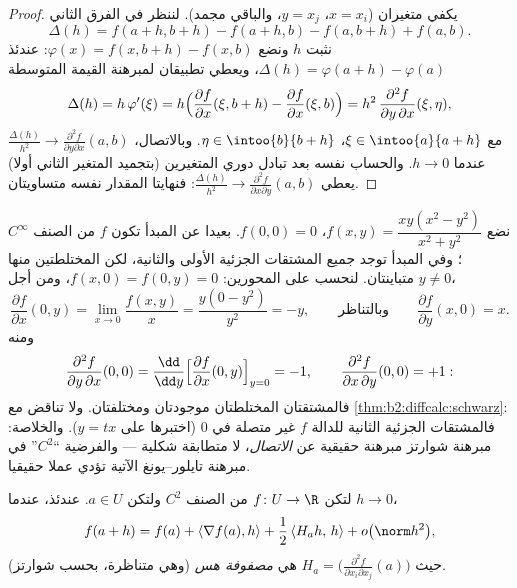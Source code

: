 \begin{proof}
يكفي متغيران ($x = x_i$، $y = x_j$، والباقي مجمد).
لننظر في الفرق الثاني
\[
\Delta(h) = f(a + h, b + h) - f(a + h, b) - f(a, b + h) + f(a,b) .
\]
نثبت $h$ ونضع $\varphi(x) = f(x, b+h) - f(x, b)$: عندئذ $\Delta(h)
= \varphi(a + h) - \varphi(a)$، ويعطي تطبيقان لمبرهنة القيمة
المتوسطة
\[
\Delta(h) = h\,\varphi'(\xi)
= h\Bigl(\frac{\partial f}{\partial x}(\xi, b+h) -
\frac{\partial f}{\partial x}(\xi, b)\Bigr)
= h^2\,\frac{\partial^2 f}{\partial y\,\partial x}(\xi, \eta),
\]
مع $\xi \in \intoo{a}{a+h}$، $\eta \in \intoo{b}{b+h}$. وبالاتصال،
$\frac{\Delta(h)}{h^2} \to \frac{\partial^2 f}{\partial
y\partial x}(a, b)$ عندما $h \to 0$. والحساب نفسه بعد تبادل دوري المتغيرين
(بتجميد المتغير الثاني أولا)
يعطي $\frac{\Delta(h)}{h^2} \to \frac{\partial^2 f}{\partial x
\partial y}(a,b)$: فنهايتا المقدار نفسه متساويتان.
\end{proof}

\begin{example}\label{ex:b2:diffcalc:peano}
نضع $f(x, y) = \dfrac{xy(x^2 - y^2)}{x^2 + y^2}$، $f(0,0) = 0$.
بعيدا عن المبدأ تكون $f$ من الصنف $C^\infty$؛ وفي المبدأ توجد جميع
المشتقات الجزئية الأولى والثانية، لكن المختلطتين منها متباينتان.
لنحسب على المحورين: $f(x, 0) = f(0, y) = 0$، ومن أجل $y \neq 0$،
\[
\frac{\partial f}{\partial x}(0, y)
= \lim_{x\to0}\frac{f(x,y)}{x}
= \frac{y(0 - y^2)}{y^2} = -y ,
\qquad\text{وبالتناظر}\qquad
\frac{\partial f}{\partial y}(x, 0) = x .
\]
ومنه
\[
\frac{\partial^2 f}{\partial y\,\partial x}(0,0)
= \frac{\dd}{\dd y}\Bigl[\frac{\partial f}{\partial
x}(0,y)\Bigr]_{y=0} = -1,
\qquad
\frac{\partial^2 f}{\partial x\,\partial y}(0,0) = +1 :
\]
فالمشتقتان المختلطتان موجودتان ومختلفتان. ولا تناقض مع
\cref{thm:b2:diffcalc:schwarz}: فالمشتقات الجزئية الثانية للدالة $f$ غير متصلة
في $0$ (اختبرها على $y = tx$). والخلاصة: مبرهنة شوارتز مبرهنة
حقيقية عن \emph{الاتصال}، لا متطابقة شكلية --- والفرضية ``$C^2$''
في مبرهنة تايلور--يونغ الآتية تؤدي عملا حقيقيا.
\end{example}

\begin{theorem}\label{thm:b2:diffcalc:taylor}
لتكن $f \colon U \to \R$ من الصنف $C^2$ ولتكن $a \in U$. عندئذ، عندما $h \to 0$،
\[
f(a + h) = f(a) + \langle\nabla f(a), h\rangle
+ \frac12\, \langle H_a h,\, h\rangle + o\bigl(\norm h^2\bigr),
\]
حيث $H_a = \bigl(\frac{\partial^2 f}{\partial x_i\partial
x_j}(a)\bigr)$ هي \emph{مصفوفة هس} (وهي متناظرة، بحسب
شوارتز).
\end{theorem}

